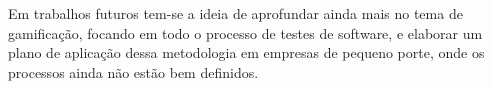 \documentclass[twoside,english,brazilian]{UNISINOSartigo}
\begin{document}
Em trabalhos futuros tem-se a ideia de aprofundar ainda mais no tema de gamificação, focando em todo o processo de testes de software, e elaborar um plano de aplicação dessa metodologia em empresas de pequeno porte, onde os processos ainda não estão bem definidos.

%





\end{document}
